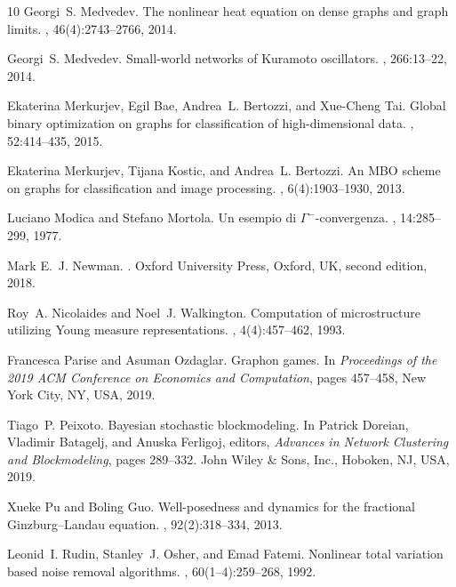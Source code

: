 \documentclass[11pt]{amsart}
\numberwithin{equation}{section}
\begin{document}
\begin{thebibliography}{10}
Georgi~S. Medvedev.
\newblock The nonlinear heat equation on dense graphs and graph limits.
, 46(4):2743--2766, 2014.

Georgi~S. Medvedev.
\newblock Small-world networks of {K}uramoto oscillators.
, 266:13--22, 2014.

Ekaterina Merkurjev, Egil Bae, Andrea~L. Bertozzi, and Xue-Cheng Tai.
\newblock Global binary optimization on graphs for classification of
  high-dimensional data.
, 52:414--435, 2015.

Ekaterina Merkurjev, Tijana Kostic, and Andrea~L. Bertozzi.
\newblock An {MBO} scheme on graphs for classification and image processing.
, 6(4):1903--1930, 2013.

Luciano Modica and Stefano Mortola.
\newblock Un esempio di {$\Gamma^-$}-convergenza.
, 14:285--299, 1977.

Mark E.~J. Newman.
.
\newblock Oxford University Press, Oxford, UK, second edition, 2018.

Roy~A. Nicolaides and Noel~J. Walkington.
\newblock Computation of microstructure utilizing {Y}oung measure
  representations.
,
  4(4):457--462, 1993.

Francesca Parise and Asuman Ozdaglar.
\newblock Graphon games.
\newblock In {\em Proceedings of the 2019 ACM Conference on Economics and
  Computation}, pages 457--458, New York City, NY, USA, 2019.

Tiago~P. Peixoto.
\newblock Bayesian stochastic blockmodeling.
\newblock In Patrick Doreian, Vladimir Batagelj, and Anuska Ferligoj, editors,
  {\em Advances in Network Clustering and Blockmodeling}, pages 289--332. John
  Wiley \& Sons, Inc., Hoboken, NJ, USA, 2019.

Xueke Pu and Boling Guo.
\newblock Well-posedness and dynamics for the fractional {G}inzburg--{L}andau
  equation.
, 92(2):318--334, 2013.

Leonid~I. Rudin, Stanley~J. Osher, and Emad Fatemi.
\newblock Nonlinear total variation based noise removal algorithms.
, 60(1--4):259--268, 1992.


\end{thebibliography}
\end{document}

